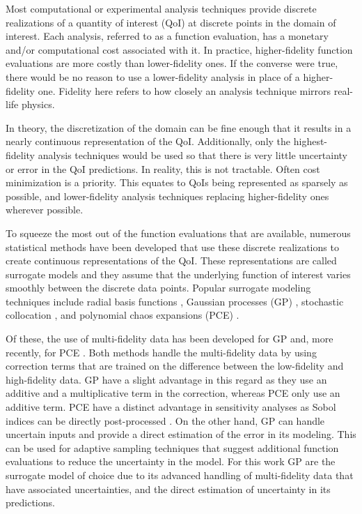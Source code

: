 Most computational or experimental analysis techniques provide discrete realizations of a quantity of interest (QoI) at discrete points in the domain of interest. 
Each analysis, referred to as a function evaluation, has a monetary and/or computational cost associated with it. 
In practice, higher-fidelity function evaluations are more costly than lower-fidelity ones.
If the converse were true, there would be no reason to use a lower-fidelity analysis in place of a higher-fidelity one.
Fidelity here refers to how closely an analysis technique mirrors real-life physics. 

In theory, the discretization of the domain can be fine enough that it results in a nearly continuous representation of the QoI.
Additionally, only the highest-fidelity analysis techniques would be used so that there is very little uncertainty or error in the QoI predictions. 
In reality, this is not tractable. 
Often cost minimization is a priority. 
This equates to QoIs being represented as sparsely as possible, and lower-fidelity analysis techniques replacing higher-fidelity ones wherever possible.  

To squeeze the most out of the function evaluations that are available, numerous statistical methods have been developed that use these discrete realizations to create continuous representations of the QoI.
These representations are called surrogate models and they assume that the underlying function of interest varies smoothly between the discrete data points.
Popular surrogate modeling techniques include radial basis functions \cite{park1991universal}, Gaussian processes (GP) \cite{krige1951statistical,matheron1963principles,rasmussen_gaussian_2006}, stochastic collocation \cite{loeven2007probabilistic}, and polynomial chaos expansions (PCE) \cite{oladyshkin2012data,blatman2011adaptive}.

Of these, the use of multi-fidelity data has been developed for GP \cite{kennedy_predicting_2000,gratiet_multi-fidelity_nodate} and, more recently, for PCE \cite{ng2012multifidelity, palar2018global}.
Both methods handle the multi-fidelity data by using correction terms that are trained on the difference between the low-fidelity and high-fidelity data. 
GP have a slight advantage in this regard as they use an additive and a multiplicative term in the correction, whereas PCE only use an additive term. 
PCE have a distinct advantage in sensitivity analyses as Sobol indices can be directly post-processed \cite{sudret2008global,crestaux2009polynomial}.
On the other hand, GP can handle uncertain inputs and provide a direct estimation of the error in its modeling.
This can be used for adaptive sampling techniques that suggest additional function evaluations to reduce the uncertainty in the model.
For this work GP are the surrogate model of choice due to its advanced handling of multi-fidelity data that have associated uncertainties, and the direct estimation of uncertainty in its predictions. 

